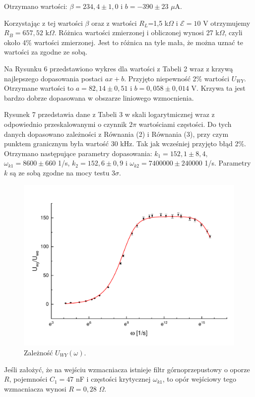 \documentclass[10pt,a4paper]{article}
\begin{document}
Otrzymano wartości: $\beta=234,4\pm1,0$ i $b=-390\pm23$ $\mu$A.

Korzystając z tej wartości $\beta$ oraz z wartości $R_{L}$=1,5 k$\Omega$ i $\mathcal{E}=10$ V otrzymujemy $R_{B}=657,52$ k$\Omega$. Różnica wartości zmierzonej i obliczonej wynosi 27 k$\Omega$, czyli około 4\% wartości zmierzonej. Jest to różnica na tyle mała, że można uznać te wartości za zgodne ze sobą.


Na Rysunku 6 przedstawiono wykres dla wartości z Tabeli 2 wraz z krzywą najlepszego dopasowania postaci $ax+b$. Przyjęto niepewność 2\% wartości $U_{WY}$. Otrzymane wartości to $a=82,14\pm0,51$ i $b=0,058\pm0,014$ V. Krzywa ta jest bardzo dobrze dopasowana w obszarze liniowego wzmocnienia.




Rysunek 7 przedstawia dane z Tabeli 3 w skali logarytmicznej wraz z odpowiednio przeskalowanymi o czynnik $2\pi$ wartościami częstości. Do tych danych dopasowano zależności z Równania (2) i Równania (3), przy czym punktem granicznym była wartość 30 kHz. Tak jak wcześniej przyjęto błąd 2\%. Otrzymano następujące parametry dopasowania: $k_{1}=152,1\pm8,4$, $\omega_{k1}=8600\pm660$ 1/s, $k_{2}=152,6\pm0,9$ i $\omega_{k2}=7400000\pm240000$ 1/s. Parametry $k$ są ze sobą zgodne na mocy testu 3$\sigma$.

\begin{figure}[h!]
\includegraphics[width=13cm]{rap21rys6.pdf} 
\centering
\caption{Zależność $U_{WY}(\omega)$.}
\end{figure}


Jeśli założyć, że na wejściu wzmacniacza istnieje filtr górnoprzepustowy o oporze $R$, pojemności $C_{1}=47$ nF i częstości krytycznej $\omega_{k1}$, to opór wejściowy tego wzmacniacza wynosi $R=0,28$ $\Omega$.
\end{document}
